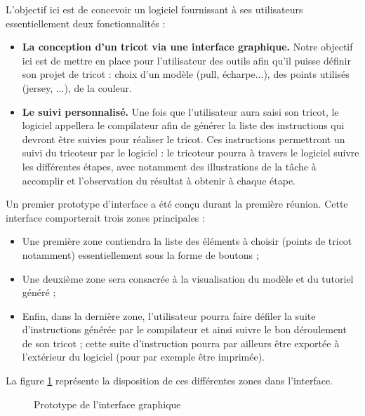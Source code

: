 \documentclass{article}
\begin{document}
L'objectif ici est de concevoir un logiciel fournissant à ses utilisateurs essentiellement deux fonctionnalités :
\begin{itemize}
  \item \textbf{La conception d'un tricot via une interface graphique.} Notre objectif ici est de mettre en place pour l'utilisateur des
  outils afin qu'il puisse définir son projet de tricot : choix d'un modèle (pull, écharpe...), des points utilisés
  (jersey, ...), de la couleur.
  \item \textbf{Le suivi personnalisé.} Une fois que l'utilisateur aura saisi son tricot, le logiciel appellera le compilateur afin de générer
la liste des instructions qui devront être suivies pour réaliser le tricot. Ces instructions permettront un suivi du tricoteur par le
logiciel : le tricoteur pourra à travers le logiciel suivre les différentes étapes, avec notamment des illustrations de la tâche à
accomplir et l'observation du résultat à obtenir à chaque étape. \newline
\end{itemize}

Un premier prototype d'interface a été conçu durant la première réunion. Cette interface comporterait trois zones principales :
\begin{itemize}
  \item Une première zone contiendra la liste des éléments à choisir (points de tricot notamment) essentiellement sous la forme de
boutons ;
  \item Une deuxième zone sera consacrée à la visualisation du modèle et du tutoriel généré ;
  \item Enfin, dans la dernière zone, l'utilisateur pourra faire défiler la suite d'instructions générée par le compilateur et ainsi
suivre le bon déroulement de son tricot ; cette suite d'instruction pourra par ailleurs être exportée à l'extérieur du logiciel (pour par exemple
être imprimée).
\end{itemize}

La figure \ref{interface} représente la disposition de ces différentes zones dans l'interface.

\begin{figure}[!h] %
  \centering
  \caption{Prototype de l'interface graphique}
  \label{interface}
  \end{figure}
\end{document}

